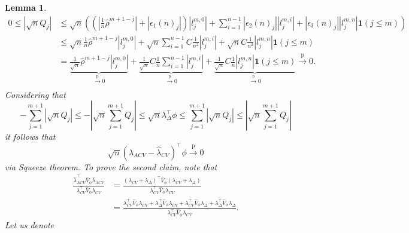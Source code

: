 \documentclass[11pt,dvipsnames]{article}
\newtheorem{lemma}{Lemma}
\begin{document}
\begin{appendices}
\begin{lemma}
\begin{equation}
\begin{split}
0\leq |\sqrt{n} Q_{j}| &\leq 
\sqrt{n}\left(  \left( |\frac{1}{n}\hat{\rho}^{m+1-j}|+|\epsilon_{1}(n)_{j}|\right)|l_{j}^{m,0}| + \sum_{i=1}^{n-1} |\epsilon_{2}(n)_{j}||l_{j}^{m,i}| + | \epsilon_{3}(n)_{j}||l_{j}^{m,n}| \mathbf{1}(j\leq m)\right)\\
&\leq \sqrt{n} \frac{1}{n}\hat{\rho}^{m+1-j}|l_{j}^{m,0}| + \sqrt{n} \sum_{i=1}^{n-1} C\frac{1}{n^{2}} |l_{j}^{m,i}| + \sqrt{n} C\frac{1}{n^{2}} |l_{j}^{m,n}| \mathbf{1}(j\leq m)\\
&=  \underbrace{\frac{1}{\sqrt{n}}\hat{\rho}^{m+1-j}|l_{j}^{m,0}|}_{\overset{\mathrm{p}}{\longrightarrow} 0} +  \underbrace{\frac{1}{\sqrt{n}} C \frac{1}{n} \sum_{i=1}^{n-1} |l_{j}^{m,i}|}_{\overset{\mathrm{p}}{\longrightarrow} 0} +\underbrace{\frac{1}{\sqrt{n}} C  \frac{1}{n} |l_{j}^{m,n}| \mathbf{1}(j\leq m)}_{\overset{\mathrm{p}}{\longrightarrow} 0} \overset{\mathrm{p}}{\longrightarrow} 0.\\
\end{split}
\end{equation}
Considering that 
\begin{equation}
-\sum_{j=1}^{m+1} |\sqrt{n} Q_{j}| \leq -|\sqrt{n}\sum_{j=1}^{m+1}  Q_{j}| \leq \sqrt{n} \lambda_{\Delta}^{\top}\phi \leq \sum_{j=1}^{m+1} |\sqrt{n} Q_{j}| \leq |\sqrt{n}\sum_{j=1}^{m+1}  Q_{j}|
\end{equation}
it follows that 
\begin{equation}
\sqrt{n}(\lambda_{ACV}-\widehat{\lambda}_{CV})^{\top} \phi \overset{\mathrm{p}}{\longrightarrow} 0
\end{equation}
via Squeeze theorem. To prove the second claim, note that
\begin{equation}
\begin{split}
\frac{\widehat{\lambda}_{ACV}^{\top} \widehat{V}_{\phi} \widehat{\lambda}_{ACV}}{\lambda_{CV}^{\top} \widehat{V}_{\phi} \lambda_{CV}} &= \frac{\left( \lambda_{CV} + \lambda_{\Delta}\right) ^{\top} \widehat{V}_{\phi}  \left( \lambda_{CV} + \lambda_{\Delta}\right) }{\lambda_{CV}^{\top} \widehat{V}_{\phi} \lambda_{CV}} \\
&= \frac{\lambda_{CV}^{\top} \widehat{V}_{\phi} \lambda_{CV} + \lambda_{\Delta}^{\top} \widehat{V}_{\phi} \lambda_{CV} + \lambda_{CV}^{\top} \widehat{V}_{\phi} \lambda_{\Delta} + \lambda_{\Delta}^{\top} \widehat{V}_{\phi} \lambda_{\Delta}}{\lambda_{CV}^{\top} \widehat{V}_{\phi} \lambda_{CV}}.
\end{split}
\end{equation}
Let us denote
\begin{equation}

\end{equation}
\end{lemma}
\end{appendices}
\end{document}
